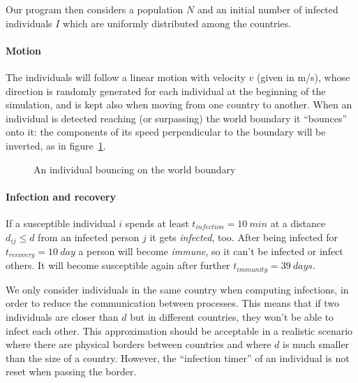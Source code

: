 \noindent
Our program then considers a population $N$ and an initial number of infected individuals $I$ which are uniformly distributed among the countries.

\paragraph{Motion}
The individuals will follow a linear motion with velocity $v$ (given in \si{m/s}), whose direction is randomly generated for each individual at the beginning of the simulation, and is kept also when moving from one country to another. When an individual is detected reaching (or surpassing) the world boundary it “bounces” onto it: the components of its speed perpendicular to the boundary will be inverted, as in figure~\ref{fig:boundary_bounce}.

\begin{figure}[h]
    \centering
    \caption{An individual bouncing on the world boundary}
    \label{fig:boundary_bounce}
\end{figure}

\paragraph{Infection and recovery}
If a susceptible individual $i$ spends at least $t_{infection} = \SI{10}{min}$ at a distance $d_{ij}\leq d$ from an infected person $j$ it gets \emph{infected}, too.
After being infected for $t_{recovery} = \SI{10}{day}$ a person will become \emph{immune}, so it can't be infected or infect others. It will become susceptible again after further $t_{immunity} = \SI{39}{days}$.

We only consider individuals in the same country when computing infections, in order to reduce the communication between processes. This means that if two individuals are closer than $d$ but in different countries, they won't be able to infect each other. This approximation should be acceptable in a realistic scenario where there are physical borders between countries and where $d$ is much smaller than the size of a country. However, the “infection timer” of an individual is not reset when passing the border.

